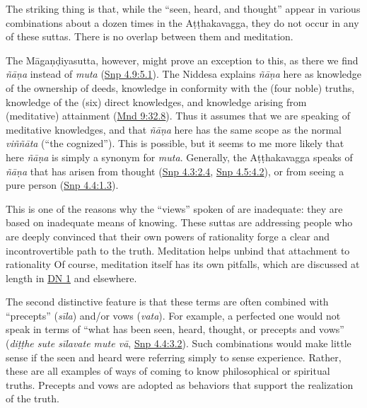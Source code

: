 \documentclass[12pt,openany]{book}%
\begin{document}
The striking thing is that, while the “seen, heard, and thought” appear in various combinations about a dozen times in the \textsanskrit{Aṭṭhakavagga}, they do not occur in any of these suttas. There is no overlap between them and meditation.

The \textsanskrit{Māgaṇḍiyasutta}, however, might prove an exception to this, as there we find \textit{\textsanskrit{ñāṇa}} instead of \textit{muta} (\href{https://suttacentral.net/snp4.9/en/sujato\#5.1}{Snp 4.9:5.1}). The Niddesa explains \textit{\textsanskrit{ñāṇa}} here as knowledge of the ownership of deeds, knowledge in conformity with the (four noble) truths, knowledge of the (six) direct knowledges, and knowledge arising from (meditative) attainment (\href{https://suttacentral.net/mnd9}{Mnd 9:32.8}). Thus it assumes that we are speaking of meditative knowledges, and that \textit{\textsanskrit{ñāṇa}} here has the same scope as the normal \textit{\textsanskrit{viññāta}} (“the cognized”). This is possible, but it seems to me more likely that here \textit{\textsanskrit{ñāṇa}} is simply a synonym for \textit{muta}. Generally, the \textsanskrit{Aṭṭhakavagga} speaks of \textit{\textsanskrit{ñāṇa}} that has arisen from thought (\href{https://suttacentral.net/snp4.3/en/sujato\#2.4}{Snp 4.3:2.4}, \href{https://suttacentral.net/snp4.5/en/sujato\#4.2}{Snp 4.5:4.2}), or from seeing a pure person (\href{https://suttacentral.net/snp4.4/en/sujato\#1.3}{Snp 4.4:1.3}).

This is one of the reasons why the “views” spoken of are inadequate: they are based on inadequate means of knowing. These suttas are addressing people who are deeply convinced that their own powers of rationality forge a clear and incontrovertible path to the truth. Meditation helps unbind that attachment to rationality Of course, meditation itself has its own pitfalls, which are discussed at length in \href{https://suttacentral.net/dn1/en/sujato}{DN 1} and elsewhere.

The second distinctive feature is that these terms are often combined with “precepts” (\textit{\textsanskrit{sīla}}) and/or vows (\textit{vata}). For example, a perfected one would not speak in terms of “what has been seen, heard, thought, or precepts and vows” (\textit{\textsanskrit{diṭṭhe} sute \textsanskrit{sīlavate} mute \textsanskrit{vā}}, \href{https://suttacentral.net/snp4.4/en/sujato\#3.2}{Snp 4.4:3.2}). Such combinations would make little sense if the seen and heard were referring simply to sense experience. Rather, these are all examples of ways of coming to know philosophical or spiritual truths. Precepts and vows are adopted as behaviors that support the realization of the truth.
\end{document}
